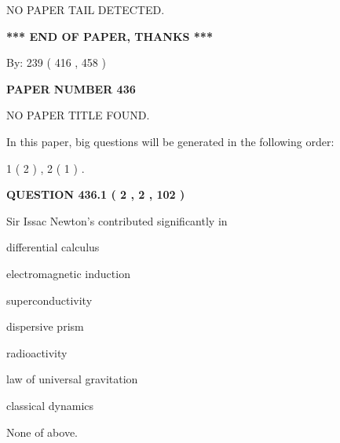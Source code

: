 \documentclass[12pt]{article}
\begin{document}
   
   
   
\vspace{2.0in} NO PAPER TAIL DETECTED.
   
   
   
   
\vspace{1.0in} 
{\textbf{\large{ *** END OF PAPER, THANKS *** }}} 
   
   
\hspace{1.0in} By: 
 239 ( 416 ,  458 )
   
   
   
   
\newpage 
\setcounter{page}{ 
   436001 } 
   
   
   
   
 {\textbf{ \Large{ PAPER NUMBER  436  }}}
   
   
\vspace{0.2in}
   
   
   
   
   
   
 NO PAPER TITLE FOUND.
   
   
   
\vspace{0.2in}
   
In this paper, big questions will be generated in the following order: 
   
   
   1 ( 2 )
 ,
   2 ( 1 )
 .
  
\vspace{0.2in}
  
{\textbf{\Large{QUESTION
436.1 
 ( 2 , 2 , 102 )
}}}
  
  
Sir Issac Newton's contributed significantly in
 
 
differential calculus
 
 
electromagnetic induction
 
 
superconductivity
 
 
dispersive prism
 
 
radioactivity
 
 
law of universal gravitation
 
 
classical dynamics
 
 
 None of above.
 
 
\noindent{}
 
\end{document}
